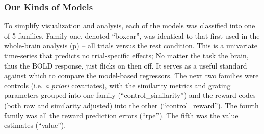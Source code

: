\documentclass[doc,12pt]{apa}        %
\begin{document}
\subsubsection{Our Kinds of Models}
\label{subsub:ourkinds}
To simplify visualization and analysis, each of the models was classified into one of 5 families.  Family one, denoted ``boxcar'', was identical to that first used in the whole-brain analysis (p\pageref{sub:blob}) -- all trials versus the rest condition.  This is a univariate time-series that predicts no trial-specific effects; No matter the task the brain, thus the BOLD response, just flicks on then off.  It serves as a useful standard against which to compare the model-based regressors.  The next two families were controls (i.e. \emph{a priori} covariates), with the similarity metrics and grating parameters grouped into one family (``control\_similarity'') and the reward codes (both raw and similarity adjusted) into the other (``control\_reward'').  The fourth family was all the reward prediction errors (``rpe'').  The fifth was the value estimates (``value'').
\end{document}
